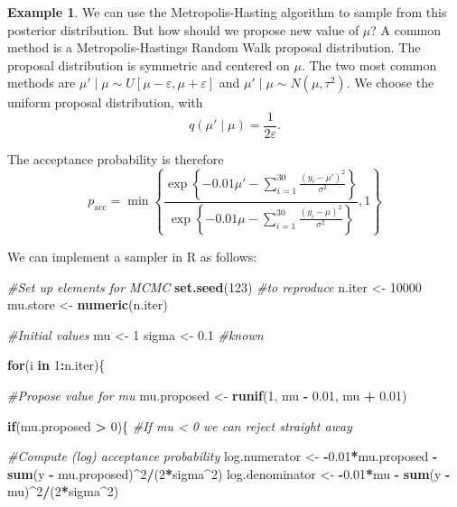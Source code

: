 \documentclass[
]{book}
\newenvironment{Shaded}{\begin{snugshade}}{\end{snugshade}}
\newcommand{\CommentTok}[1]{\textcolor[rgb]{0.56,0.35,0.01}{\textit{#1}}}
\newcommand{\ControlFlowTok}[1]{\textcolor[rgb]{0.13,0.29,0.53}{\textbf{#1}}}
\newcommand{\DecValTok}[1]{\textcolor[rgb]{0.00,0.00,0.81}{#1}}
\newcommand{\FloatTok}[1]{\textcolor[rgb]{0.00,0.00,0.81}{#1}}
\newcommand{\FunctionTok}[1]{\textcolor[rgb]{0.13,0.29,0.53}{\textbf{#1}}}
\newcommand{\NormalTok}[1]{#1}
\newcommand{\OtherTok}[1]{\textcolor[rgb]{0.56,0.35,0.01}{#1}}
\newcommand{\SpecialCharTok}[1]{\textcolor[rgb]{0.81,0.36,0.00}{\textbf{#1}}}
\theoremstyle{definition}
\theoremstyle{definition}
\newtheorem{example}{Example}[chapter]
\theoremstyle{definition}
\theoremstyle{definition}
\theoremstyle{remark}
\begin{document}
\begin{example}
We can use the Metropolis-Hasting algorithm to sample from this posterior distribution. But how should we propose new value of \(\mu\)? A common method is a Metropolis-Hastings Random Walk proposal distribution. The proposal distribution is symmetric and centered on \(\mu\). The two most common methods are \(\mu' \mid \mu \sim U[\mu - \varepsilon, \mu + \varepsilon]\) and \(\mu' \mid \mu \sim N(\mu, \tau^2)\). We choose the uniform proposal distribution, with
\[
q(\mu' \mid \mu) = \frac{1}{2\varepsilon}.
\]

The acceptance probability is therefore
\[
p_\textrm{acc} = \min\left\{\frac{\exp\left\{-0.01\mu' -\sum_{i=1}^{30}\frac{(y_i - \mu')^2}{\sigma^2}\right\} }{\exp\left\{-0.01\mu -\sum_{i=1}^{30}\frac{(y_i - \mu)^2}{\sigma^2}\right\} }, 1\right\}
\]

We can implement a sampler in R as follows:

\begin{Shaded}
\begin{Highlighting}[]
\CommentTok{\#Set up elements for MCMC}
\FunctionTok{set.seed}\NormalTok{(}\DecValTok{123}\NormalTok{) }\CommentTok{\#to reproduce}
\NormalTok{n.iter   }\OtherTok{\textless{}{-}} \DecValTok{10000}
\NormalTok{mu.store }\OtherTok{\textless{}{-}} \FunctionTok{numeric}\NormalTok{(n.iter)}

\CommentTok{\#Initial values}
\NormalTok{mu }\OtherTok{\textless{}{-}} \DecValTok{1} 
\NormalTok{sigma }\OtherTok{\textless{}{-}} \FloatTok{0.1} \CommentTok{\#known}

\ControlFlowTok{for}\NormalTok{(i }\ControlFlowTok{in} \DecValTok{1}\SpecialCharTok{:}\NormalTok{n.iter)\{}
  
  \CommentTok{\#Propose value for mu}
\NormalTok{  mu.proposed }\OtherTok{\textless{}{-}} \FunctionTok{runif}\NormalTok{(}\DecValTok{1}\NormalTok{, mu }\SpecialCharTok{{-}} \FloatTok{0.01}\NormalTok{, mu }\SpecialCharTok{+} \FloatTok{0.01}\NormalTok{)}
  
  \ControlFlowTok{if}\NormalTok{(mu.proposed }\SpecialCharTok{\textgreater{}} \DecValTok{0}\NormalTok{)\{ }\CommentTok{\#If mu \textless{} 0 we can reject straight away}
    
    \CommentTok{\#Compute (log) acceptance probability}
\NormalTok{    log.numerator   }\OtherTok{\textless{}{-}} \SpecialCharTok{{-}}\FloatTok{0.01}\SpecialCharTok{*}\NormalTok{mu.proposed }\SpecialCharTok{{-}} 
                      \FunctionTok{sum}\NormalTok{(y }\SpecialCharTok{{-}}\NormalTok{ mu.proposed)}\SpecialCharTok{\^{}}\DecValTok{2}\SpecialCharTok{/}\NormalTok{(}\DecValTok{2}\SpecialCharTok{*}\NormalTok{sigma}\SpecialCharTok{\^{}}\DecValTok{2}\NormalTok{)}
\NormalTok{    log.denominator }\OtherTok{\textless{}{-}} \SpecialCharTok{{-}}\FloatTok{0.01}\SpecialCharTok{*}\NormalTok{mu }\SpecialCharTok{{-}} \FunctionTok{sum}\NormalTok{(y }\SpecialCharTok{{-}}\NormalTok{ mu)}\SpecialCharTok{\^{}}\DecValTok{2}\SpecialCharTok{/}\NormalTok{(}\DecValTok{2}\SpecialCharTok{*}\NormalTok{sigma}\SpecialCharTok{\^{}}\DecValTok{2}\NormalTok{)}
    

\end{Highlighting}
\end{Shaded}
\end{example}
\end{document}
